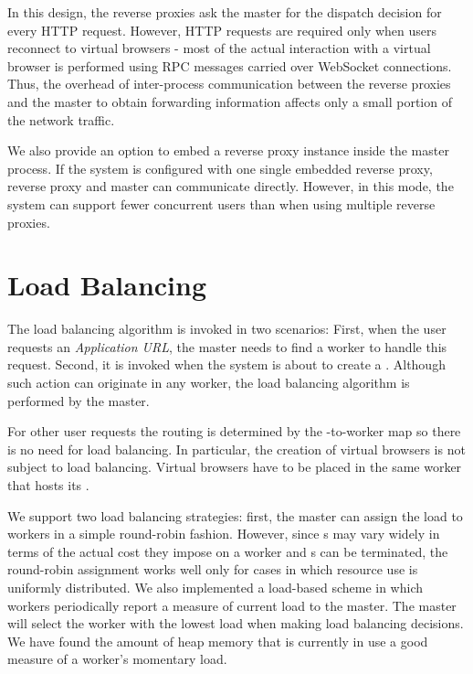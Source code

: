 
In this design, the reverse proxies ask the master for the dispatch decision
for every HTTP request.  However, HTTP requests are required only when users
reconnect to virtual browsers - most of the actual interaction with a virtual
browser is performed using RPC messages carried over WebSocket connections.
Thus, the overhead of inter-process communication between the reverse proxies and
the master to obtain forwarding information affects only a small portion of the network traffic. 

We also provide an option to embed a reverse proxy instance inside the master process.
If the system is configured with one single embedded reverse proxy,
reverse proxy and master can communicate directly.
However, in this mode, the system can support fewer concurrent users than 
when using multiple reverse proxies.

\section{Load Balancing}
\label{sec:lb}

The load balancing algorithm is invoked in two scenarios:
First, when the user requests an \emph{Application URL},
the master needs to find a worker to handle this request.
Second, it is invoked when the system is about to create a \appins{}.
Although such action can originate in any worker,
the load balancing algorithm is performed by the master.

For other user requests the routing is determined by the \appins{}-to-worker map
so there is no need for load balancing.
In particular, the creation of virtual browsers is not subject to load balancing.
Virtual browsers have to be placed in the same worker that hosts its \appins{}.

We support two load balancing strategies: first, the master can assign the
load to workers in a simple round-robin fashion. However, since \appins{}s may
vary widely in terms of the actual cost they impose on a worker and \appins{}s
can be terminated, the round-robin assignment works well only for cases in 
which resource use is uniformly distributed.
We also implemented a load-based scheme in which
workers periodically report a measure of current load to the master. The
master will select the worker with the lowest load when making load balancing decisions.
We have found the amount of heap memory that is currently in use a good measure
of a worker's momentary load.

